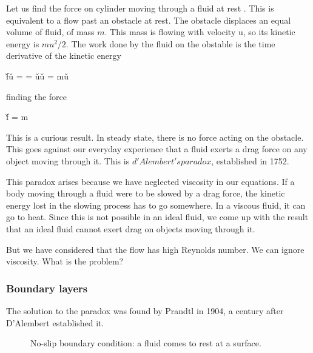 Let us find the force on cylinder moving through a
fluid at rest . This is equivalent to a flow past an obstacle at
rest. The obstacle displaces an equal volume of fluid, of mass
$m$. This mass is flowing with velocity u, so its kinetic energy is
$mu^2/2$. The work done by the fluid on the obstable is the time
derivative of the kinetic energy 

\beq
\v{f}\cdot\v{u} =   = \v{u}\cdot\v{u} = m\v{u}\cdot{}
\eeq

finding the force 

\beq
\v{f} = m
\eeq

This is a curious result. In steady state, there is no force acting on the obstacle. This
goes against our everyday experience that a fluid exerts a drag
force on any object moving through it. This is $d'Alembert's
paradox$, established in 1752. 

This paradox arises because we have neglected viscosity in
our equations. If a body moving through a fluid were to be slowed
by a drag force, the kinetic energy lost in the slowing process has to
go somewhere. In a viscous fluid, it can go to heat. Since this is not
possible in an ideal fluid, we come up with the result that an ideal fluid
cannot exert drag on objects moving through it.

But we have considered that the flow has high Reynolds number. We can
ignore viscosity. What is the problem? 

\subsubsection{Boundary layers}

The solution to the paradox was found by Prandtl in 1904, a century after
D'Alembert established it.

\begin{figure}
  \begin{center}
  \end{center}
  \caption[]{No-slip boundary condition: a fluid comes to rest at a surface.}
  \label{fig:noslip}
\end{figure}


